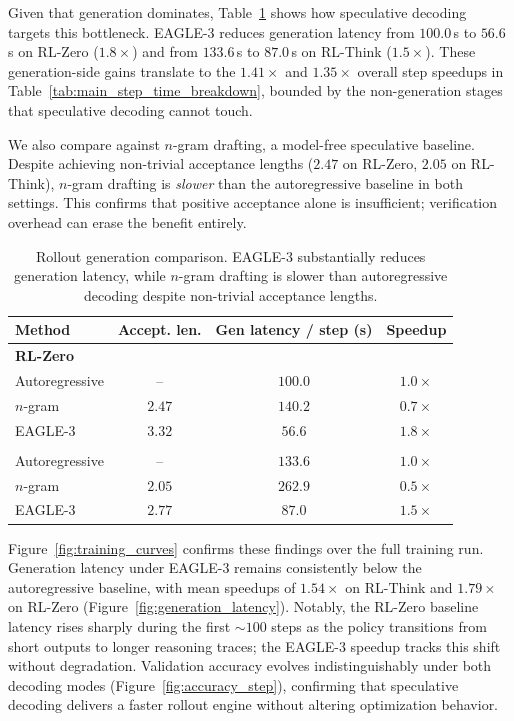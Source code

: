 \documentclass[11pt, logo, onecolumn, copyright, colorlinks=true, allcolors=blue]{nvidiatechreport}
\begin{document}
Given that generation dominates, Table~\ref{tab:draft_config_results} shows how speculative decoding targets this bottleneck. EAGLE-3 reduces generation latency from $100.0$\,s to $56.6$\,s on RL-Zero ($1.8\times$) and from $133.6$\,s to $87.0$\,s on RL-Think ($1.5\times$). These generation-side gains translate to the $1.41\times$ and $1.35\times$ overall step speedups in Table~\ref{tab:main_step_time_breakdown}, bounded by the non-generation stages that speculative decoding cannot touch.

We also compare against $n$-gram drafting, a model-free speculative baseline. Despite achieving non-trivial acceptance lengths ($2.47$ on RL-Zero, $2.05$ on RL-Think), $n$-gram drafting is \emph{slower} than the autoregressive baseline in both settings. This confirms that positive acceptance alone is insufficient; verification overhead can erase the benefit entirely.

\begin{table}[ht]
  \centering
  \small
  \begin{tabular}{l ccc}
  \toprule
  Method & {Accept. len.} & {Gen latency / step (s)} & {Speedup} \\
  \midrule
  \multicolumn{4}{l}{\textbf{RL-Zero}} \\
  Autoregressive & -- & $100.0$ & $1.0\times$ \\
  $n$-gram       & $2.47$ & $140.2$ & $0.7\times$ \\
  EAGLE-3        & $3.32$ & $56.6$  & $1.8\times$ \\\midrule
  \addlinespace
  \multicolumn{4}{l}{\textbf{RL-Think}} \\
  Autoregressive & -- & $133.6$ & $1.0\times$ \\
  $n$-gram       & $2.05$ & $262.9$ & $0.5\times$ \\
  EAGLE-3        & $2.77$ & $87.0$  & $1.5\times$ \\
  \bottomrule
  \end{tabular}
  \caption{Rollout generation comparison. EAGLE-3 substantially reduces generation latency, while $n$-gram drafting is slower than autoregressive decoding despite non-trivial acceptance lengths.}
  \label{tab:draft_config_results}
\end{table}

Figure~\ref{fig:training_curves} confirms these findings over the full training run. Generation latency under EAGLE-3 remains consistently below the autoregressive baseline, with mean speedups of $1.54\times$ on RL-Think and $1.79\times$ on RL-Zero (Figure~\ref{fig:generation_latency}). Notably, the RL-Zero baseline latency rises sharply during the first ${\sim}100$ steps as the policy transitions from short outputs to longer reasoning traces; the EAGLE-3 speedup tracks this shift without degradation. Validation accuracy evolves indistinguishably under both decoding modes (Figure~\ref{fig:accuracy_step}), confirming that speculative decoding delivers a faster rollout engine without altering optimization behavior.
\end{document}

